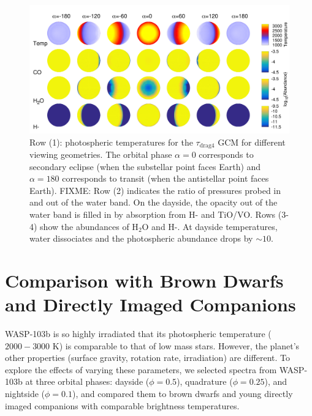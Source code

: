 \documentclass[twocolumn]{aastex61}
\begin{document}
\begin{figure}
	\includegraphics[width = 1.0\textwidth]{Figures/GCM_abundances.pdf}
	\caption{Row (1): photospheric temperatures for the $\tau_\mathrm{drag4}$ GCM for different viewing geometries.  The orbital phase $\alpha=0$ corresponds to secondary eclipse (when the substellar point faces Earth) and $\alpha=180$ corresponds to transit (when the antistellar point faces Earth). FIXME: Row (2) indicates the ratio of pressures probed in and out of the water band. On the dayside, the opacity out of the water band is filled in by absorption from H- and TiO/VO. Rows (3-4) show the abundances of H$_2$O and H-. At dayside temperatures, water dissociates and the photospheric abundance drops by $\sim10$.}
\label{fig:GCMabundance}
\end{figure}

\section{Comparison with Brown Dwarfs and Directly Imaged Companions}
\label{sec:comparison}
WASP-103b is so highly irradiated that its photospheric temperature ($2000 - 3000$ K) is comparable to that of low mass stars. However, the planet's other properties (surface gravity, rotation rate, irradiation) are different. To explore the effects of varying these parameters, we selected spectra from WASP-103b at three orbital phases: dayside ($\phi = 0.5$), quadrature ($\phi = 0.25$), and nightside ($\phi = 0.1$), and compared them to brown dwarfs and young directly imaged companions with comparable brightness temperatures.
\end{document}

